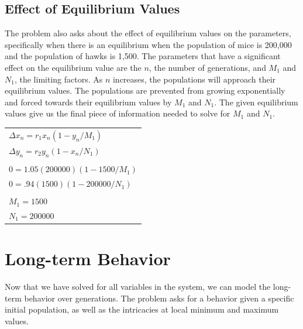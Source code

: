 \documentclass[10pt,letterpaper]{article}
\begin{document}
		\subsection{Effect of Equilibrium Values}
			The problem also asks about the effect of equilibrium values on the parameters, specifically when there is an equilibrium when the population of mice is 200,000 and the population of hawks is 1,500.
			\newline \newline
			The parameters that have a significant effect on the equilibrium value are the $n$, the number of generations, and $M_{1}$ and $N_{1}$, the limiting factors. As $n$ increases, the populations will approach their equilibrium values. The populations are prevented from growing exponentially and forced towards their equilibrium values by $M_{1}$ and $N_{1}$.
			\newline \newline
			The given equilibrium values give us the final piece of information needed to solve for $M_{1}$ and $N_{1}$.
			\begin{center}
				\begin{tabular}{l}
					$\Delta x_{n} = r_{1} x_{n} (1 - y_{n} / M_{1})$ \\
					$\Delta y_{n} = r_{2} y_{n} (1 - x_{n} / N_{1})$ \\ \\
					$0 = 1.05 (200000) (1 - 1500 / M_{1})$ \\
					$0 = .94 (1500) (1 - 200000 / N_{1})$ \\ \\
					$M_{1} = 1500$ \\
					$N_{1} = 200000$ \\
				 \end{tabular}
			\end{center}
	\section{Long-term Behavior}
		Now that we have solved for all variables in the system, we can model the long-term behavior over generations. The problem asks for a behavior given a specific initial population, as well as the intricacies at local minimum and maximum values.
\end{document}
